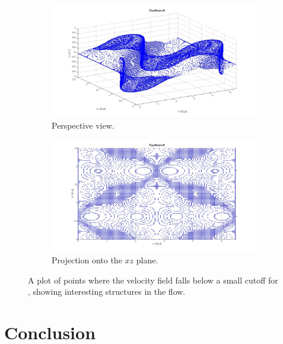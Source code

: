 \documentclass[lineno]{jfm}
\begin{document}
\begin{figure}
\centering
    \begin{subfigure}{0.9\textwidth}
    \includegraphics[width=1.0\textwidth]{usquare_EQ8_cute1.jpg}
      \caption{
        Perspective view.
       }
      \label{fig:usquare_EQ8_1}
    \end{subfigure}

    \begin{subfigure}{0.9\textwidth}
    \includegraphics[width=1.0\textwidth]{usquare_EQ8_cute2.jpg}
      \caption{
       Projection onto the $xz$
       plane.
       }
      \label{fig:usquare_EQ8_2}
    \end{subfigure}  
    \caption{
A plot of points where the velocity field falls below a small cutoff for 
{\tEQeight}, showing interesting structures in the flow. 
       }
    \label{fig:usquare_both}
 \end{figure}


\section{Conclusion}
\label{s:conclusion}
\end{document}
